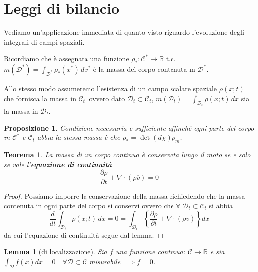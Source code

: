 \documentclass{book}
\theoremstyle{plain}
\newtheorem{teo}{Teorema}[chapter]
\theoremstyle{plain}
\newtheorem*{lemma}{Lemma}
\theoremstyle{plain}
\theoremstyle{plain}
\theoremstyle{plain}
\newtheorem{prop}{Proposizione}[chapter]
\theoremstyle{definition}
\theoremstyle{remark}
\theoremstyle{definition}
\begin{document}
\section{Leggi di bilancio}

Vediamo un'applicazione immediata di quanto visto riguardo l'evoluzione degli integrali di campi spaziali.

\noindent Ricordiamo che è assegnata una funzione $\rho_*: \mathcal{C}^*\to\mathbb{R}$ t.c. $m(\mathcal{D}^*)=\int_{\mathcal{D}^*}\rho_*(\overline{x}^*)\,d\overline{x}^*$ è la massa del corpo contenuta in $\mathcal{D}^*$.

\noindent Allo stesso modo assumeremo l'esistenza di un campo scalare spaziale $\rho(\overline{x};t)$ che fornisca la massa in $\mathcal{C}_t$, ovvero dato $\mathcal{D}_t\subset\mathcal{C}_t$, $m(\mathcal{D}_t)=\int_{\mathcal{D}_t}\rho(\overline{x};t)\,d\overline{x}$ sia la massa in $\mathcal{D}_t$.

\begin{prop}
    Condizione necessaria e sufficiente affinché ogni parte del corpo in $\mathcal{C}^*$ e $\mathcal{C}_t$ abbia la stessa massa è che $\rho_*=\det(d\overline{\chi})\rho_m$.
\end{prop}

\begin{teo}
    La massa di un corpo continuo è conservata lungo il moto se e solo se vale l'\textbf{equazione di continuità}
    \begin{displaymath}
    \boxed{
        \frac{\partial\rho}{\partial t} + \nabla\cdot(\rho\overline{v})=0
        }
    \end{displaymath}
\end{teo}

\begin{proof}
    Possiamo imporre la conservazione della massa richiedendo che la massa contenuta in ogni parte del corpo si conservi ovvero che $\forall\;\mathcal{D}_t\subset\mathcal{C}_t$ si abbia
    \begin{displaymath}
        \frac{d}{dt}\int_{\mathcal{D}_t}\rho(\overline{x};t)\,d\overline{x}=0=\int_{\mathcal{D}_t}\left\{\frac{\partial\rho}{\partial t}+\nabla\cdot(\rho\overline{v})\right\}d\overline{x}
    \end{displaymath}
    da cui l'equazione di continuità segue dal lemma.
\end{proof}

\begin{lemma}[di localizzazione]
    Sia $f$ una funzione continua: $\mathcal{C}\to\mathbb{R}$ e sia $\int_{\mathcal{D}}f(\overline{x})d\overline{x}=\overline{0} \quad\forall \mathcal{D}\subset \mathcal{C}$ misurabile $\implies f=0$.
\end{lemma}
\end{document}
